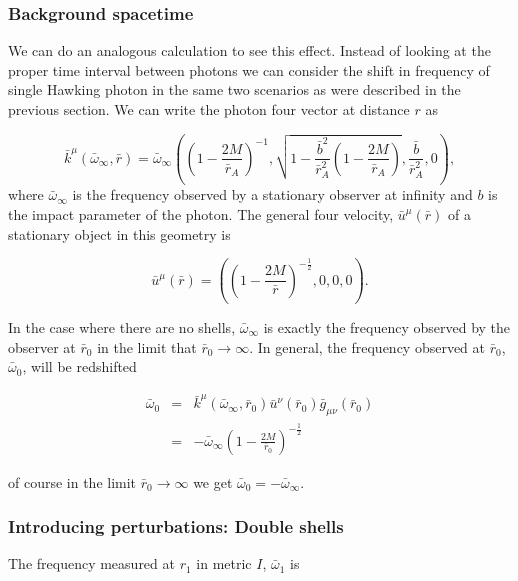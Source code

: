 \documentclass[aps,showpacs,twocolumn,floats,prd,superscriptaddress,nofootinbib]{revtex4-1}
\begin{document}
\subsubsection{Background spacetime}
We can do an analogous calculation to see this effect. Instead of looking at the proper time interval between photons we can consider the shift in frequency of single Hawking photon in the same two scenarios as were described in the previous section. We can write the photon four vector at distance $r$ as

\begin{equation}
	\bar{k}^\mu (\bar{\omega}_\infty, \bar{r}) = \bar{\omega}_\infty \left( \left( 1 - \frac{2M}{\bar{r}_A} \right)^{-1}, \sqrt{ 1 - \frac{\bar{b}^2}{\bar{r}_A^2} \left( 1 - \frac{2M}{\bar{r}_A} \right)}, \frac{\bar{b}}{\bar{r}_A^2}, 0 \right),
\end{equation}
where $\bar{\omega}_\infty$ is the frequency observed by a stationary observer at infinity and $b$ is the impact parameter of the photon. The general four velocity, $\bar{u}^\mu(\bar{r})$ of a stationary object in this geometry is

\begin{equation}
	\bar{u}^\mu(\bar{r}) = \left( \left( 1 - \frac{2M}{\bar{r}} \right)^{-\frac{1}{2}}, 0, 0, 0 \right).
\end{equation}

In the case where there are no shells, $\bar{\omega}_\infty$ is exactly the frequency observed by the observer at $\bar{r}_0$ in the limit that $\bar{r}_0 \rightarrow \infty$. In general, the frequency observed at $\bar{r}_0$, $\bar{\omega}_0$, will be redshifted

\begin{eqnarray}
	\bar{\omega}_0 & = & \bar{k}^\mu(\bar{\omega}_\infty, \bar{r}_0) \bar{u}^\nu(\bar{r}_0) \bar{g}_{\mu \nu}(\bar{r}_0) 	\nonumber	\\
	& = & - \bar{\omega}_\infty \left( 1 - \frac{2M}{\bar{r}_0} \right)^{-\frac{1}{2} }
\end{eqnarray}

of course in the limit $\bar{r}_0 \rightarrow \infty$ we get $\bar{\omega}_0 = -\bar{\omega}_\infty$. 

\subsubsection{Introducing perturbations: Double shells}

The frequency measured at $r_1$ in metric $I$, $\bar{\omega}_1$ is 
\end{document}
